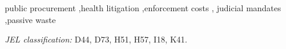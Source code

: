 \documentclass[a4paper,fleqn]{cas-sc}
\begin{document}
\begin{keywords}
public procurement \sep health litigation \sep enforcement costs \sep
judicial mandates \sep passive waste
\end{keywords}

\maketitle

\vspace{1ex}
\noindent\textit{JEL classification:} D44, D73, H51, H57, I18, K41.








\printcredits




\end{document}
